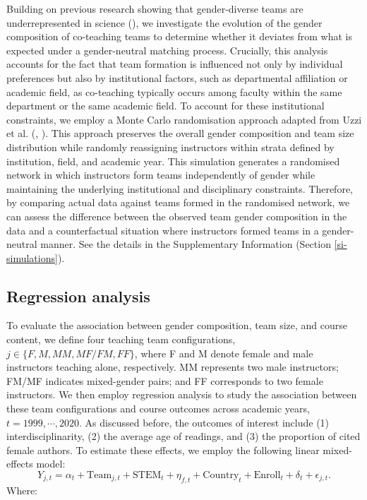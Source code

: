 \documentclass[
  12pt,
]{article}
\begin{document}
Building on previous research showing that gender-diverse teams are underrepresented in science (), we investigate the evolution of the gender composition of co-teaching teams to determine whether it deviates from what is expected under a gender-neutral matching process. Crucially, this analysis accounts for the fact that team formation is influenced not only by individual preferences but also by institutional factors, such as departmental affiliation or academic field, as co-teaching typically occurs among faculty within the same department or the same academic field. To account for these institutional constraints, we employ a Monte Carlo randomisation approach adapted from Uzzi et al. (, ). This approach preserves the overall gender composition and team size distribution while randomly reassigning instructors within strata defined by institution, field, and academic year. This simulation generates a randomised network in which instructors form teams independently of gender while maintaining the underlying institutional and disciplinary constraints. Therefore, by comparing actual data against teams formed in the randomised network, we can assess the difference between the observed team gender composition in the data and a counterfactual situation where instructors formed teams in a gender-neutral manner. See the details in the Supplementary Information (Section \ref{si-simulations}).

\subsection{Regression analysis}\label{regression-analysis}

To evaluate the association between gender composition, team size, and course content, we define four teaching team configurations, \(j\in \{F, M, MM, MF/FM, FF\}\), where F and M denote female and male instructors teaching alone, respectively. MM represents two male instructors; FM/MF indicates mixed-gender pairs; and FF corresponds to two female instructors. We then employ regression analysis to study the association between these team configurations and course outcomes across academic years, \(t = 1999, \cdots, 2020\). As discussed before, the outcomes of interest include (1) interdisciplinarity, (2) the average age of readings, and (3) the proportion of cited female authors. To estimate these effects, we employ the following linear mixed-effects model:
\[
Y_{j, t} = 
 \alpha_t + 
 \text{Team}_{j, t} + 
 \text{STEM}_t + \eta_{f,t} +  %
 \text{Country}_{t} + \text{Enroll}_t + \delta_{t} + 
 \epsilon_{j, t}.
\]
Where:
\end{document}
